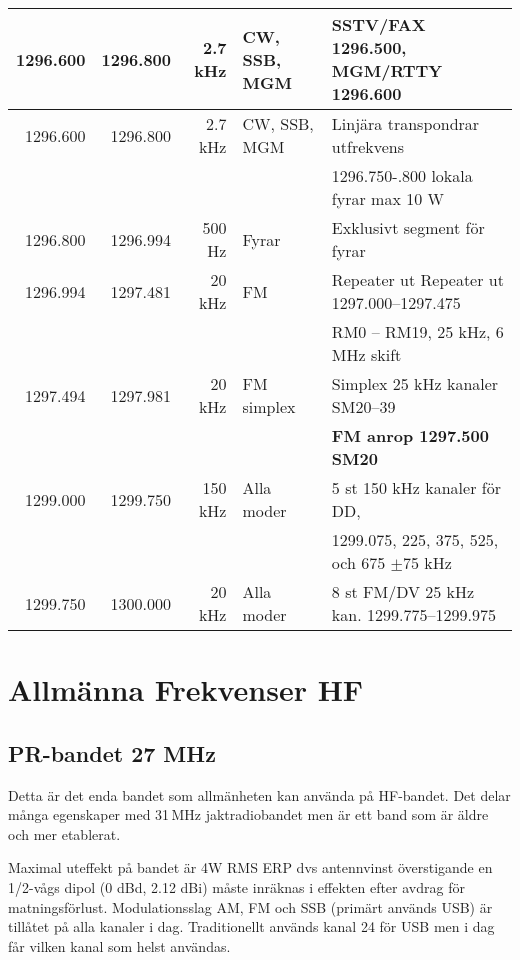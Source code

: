 {\begin{tabular}{rrrll}
	         1296.600 & 1296.800 &     2.7 kHz & CW, SSB, MGM    & SSTV/FAX 1296.500, MGM/RTTY 1296.600          \\ \hline
	         1296.600 & 1296.800 &     2.7 kHz & CW, SSB, MGM    & Linjära transpondrar utfrekvens               \\
	                  &          &             &                 & 1296.750-.800 lokala fyrar max 10 W           \\ \hline
	         1296.800 & 1296.994 &      500 Hz & Fyrar           & Exklusivt segment för fyrar                   \\ \hline
	         1296.994 & 1297.481 &      20 kHz & FM              & Repeater ut Repeater ut 1297.000--1297.475    \\
	                  &          &             &                 & RM0 – RM19, 25 kHz, 6 MHz skift               \\ \hline
	         1297.494 & 1297.981 &      20 kHz & FM simplex      & Simplex 25 kHz kanaler SM20--39               \\
	                  &          &             &                 & \textbf{FM anrop 1297.500 SM20}               \\ \hline
	         1299.000 & 1299.750 &     150 kHz & Alla moder      & 5 st 150 kHz kanaler för DD,                  \\
	                  &          &             &                 & 1299.075, 225, 375, 525, och 675 $\pm$75 kHz  \\ \hline
	         1299.750 & 1300.000 &      20 kHz & Alla moder      & 8 st FM/DV 25 kHz kan. 1299.775--1299.975
\end{tabular}}

\clearpage

\section{Allmänna Frekvenser HF}

\subsection{PR-bandet 27 MHz}

Detta är det enda bandet som allmänheten kan använda på HF-bandet. Det delar
många egenskaper med 31\,MHz jaktradiobandet men är ett band som är äldre och
mer etablerat.

Maximal uteffekt på bandet är 4W RMS ERP dvs antennvinst överstigande en
1/2-vågs dipol (0 dBd, 2.12 dBi) måste inräknas i effekten efter avdrag för
matningsförlust. Modulationsslag AM, FM och SSB (primärt används USB) är
tillåtet på alla kanaler i dag. Traditionellt används kanal 24 för USB men i
dag får vilken kanal som helst användas.

